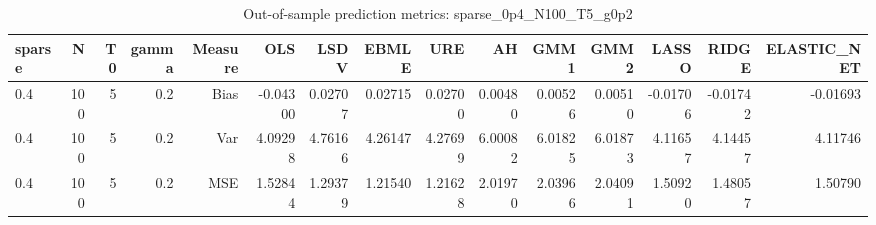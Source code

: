 \begin{table}[!htbp]\centering
\caption{Out-of-sample prediction metrics: sparse_0p4_N100_T5_g0p2}
\label{tab:table3_sparse_0p4_N100_T5_g0p2}
\begin{tabular}{lrrrrrrrrrrrrrr}
\hline
sparse & N & T0 & gamma & Measure & OLS & LSDV & EBMLE & URE & AH & GMM1 & GMM2 & LASSO & RIDGE & ELASTIC_NET \\
\hline
0.4 & 100 & 5 & 0.2 & Bias & -0.04300 & 0.02707 & 0.02715 & 0.02700 & 0.00480 & 0.00526 & 0.00510 & -0.01706 & -0.01742 & -0.01693 \\
0.4 & 100 & 5 & 0.2 & Var & 4.09298 & 4.76166 & 4.26147 & 4.27699 & 6.00082 & 6.01825 & 6.01873 & 4.11657 & 4.14457 & 4.11746 \\
0.4 & 100 & 5 & 0.2 & MSE & 1.52844 & 1.29379 & 1.21540 & 1.21628 & 2.01970 & 2.03966 & 2.04091 & 1.50920 & 1.48057 & 1.50790 \\
\hline
\end{tabular}
\end{table}

